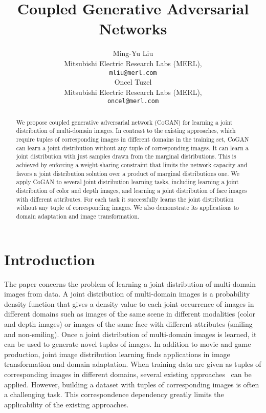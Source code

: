 \documentclass{article}
\title{Coupled Generative Adversarial Networks}
\author{
  Ming-Yu Liu\\
  Mitsubishi Electric Research Labs (MERL),\\
  \texttt{mliu@merl.com} \\
  \And
  Oncel Tuzel\\
  Mitsubishi Electric Research Labs (MERL),\\
  \texttt{oncel@merl.com} \\
}
\begin{document}
\maketitle

\begin{abstract}
We propose coupled generative adversarial network (CoGAN) for learning a joint distribution of multi-domain images. In contrast to the existing approaches, which require tuples of corresponding images in different domains in the training set, CoGAN can learn a joint distribution without any tuple of corresponding images. It can learn a joint distribution with just samples drawn from the marginal distributions. This is achieved by enforcing a weight-sharing constraint that limits the network capacity and favors a joint distribution solution over a product of marginal distributions one. We apply CoGAN to several joint distribution learning tasks, including learning a joint distribution of color and depth images, and learning a joint distribution of face images with different attributes. For each task it successfully learns the joint distribution without any tuple of corresponding images. We also demonstrate its applications to domain adaptation and image transformation.
\end{abstract}

\section{Introduction}

The paper concerns the problem of learning a joint distribution of multi-domain images from data. A joint distribution of multi-domain images is a probability density function that gives a density value to each joint occurrence of images in different domains such as images of the same scene in different modalities (color and depth images) or images of the same face with different attributes (smiling and non-smiling). Once a joint distribution of multi-domain images is learned, it can be used to generate novel tuples of images. In addition to movie and game production, joint image distribution learning finds applications in image transformation and domain adaptation. When training data are given as tuples of corresponding images in different domains, several existing approaches~\cite{srivastava2012multimodal,wang2012semi,ngiam2011multimodal,yang2010image} can be applied. However, building a dataset with tuples of corresponding images is often a challenging task. This correspondence dependency greatly limits the applicability of the existing approaches.
\end{document}
